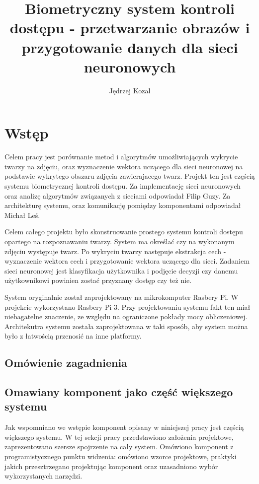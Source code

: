 \documentclass[oneside, eng]{mgr}
\title{Biometryczny system kontroli dostępu - przetwarzanie obrazów i przygotowanie danych dla sieci neuronowych}
\author{Jędrzej Kozal}
\begin{document}


\maketitle

\linespread{1.5}

\chapter{Wstęp}
Celem pracy jest porównanie metod i algorytmów umożliwiających wykrycie twarzy na zdjęciu, oraz wyznaczenie wektora uczącego dla sieci neuronowej na podstawie wykrytego obszaru zdjęcia zawierajacego twarz. Projekt ten jest częścią systemu biometrycznej kontroli dostępu. Za implementację sieci neuronowych oraz analizę algorytmów związanych z sieciami odpowiadał Filip Guzy. Za architekturę systemu, oraz komunikację pomiędzy komponentami odpowiadał Michał Leś. 

Celem całego projektu było skonstruowanie prostego systemu kontroli dostępu opartego na rozpoznawaniu twarzy. System ma określać czy na wykonanym zdjęciu występuje twarz. Po wykryciu twarzy następuje ekstrakcja cech - wyznaczenie wektora cech i przygotowanie wektora uczącego dla sieci. Zadaniem sieci neuronowej jest klasyfikacja użytkownika i podjęcie decyzji czy danemu użytkownikowi powinien zostać przyznany dostęp czy też nie.

System oryginalnie został zaprojektowany na mikrokomputer Rasbery Pi. W projekcie wykorzystano Rasbery Pi 3. Przy projektowaniu systemu fakt ten miał niebagatelne znaczenie, ze względu na ograniczone pokłady mocy obliczeniowej. Architekutra systemu została zaprojektowana w taki sposób, aby system można było z łatwością przenosić na inne platformy. 


\section{Omówienie zagadnienia}

\section{Omawiany komponent jako część większego systemu} 

Jak wspomniano we wstępie komponent opisany w niniejszej pracy jest częścią większego systemu. W tej sekcji pracy przedstawiono założenia projektowe, zaprezentowano szersze spojrzenie na cały system. Omówiono komponent z programistycznego punktu widzenia: omówiono wzorce projektowe, praktyki jakich przesztrzegano projektując komponent oraz uzasadniono wybór wykorzystanych narzędzi.
\end{document}
